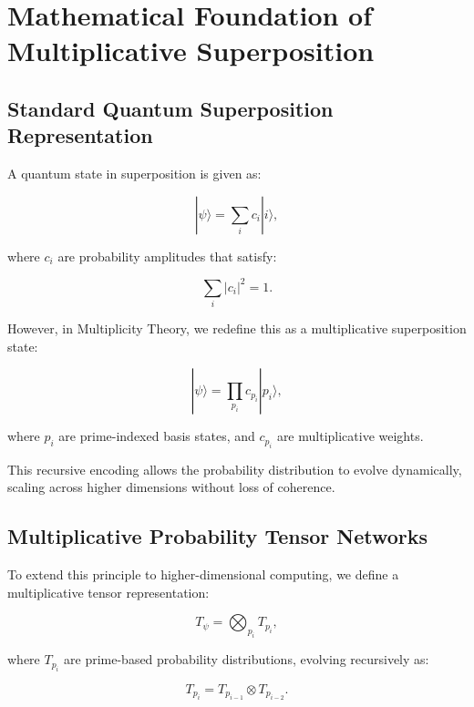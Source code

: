 \documentclass{article}
\theoremstyle{plain}
\begin{document}
\section{Mathematical Foundation of Multiplicative Superposition}

\subsection{Standard Quantum Superposition Representation}

A quantum state in superposition is given as:

\begin{equation}
|\psi\rangle = \sum_{i} c_i |i\rangle,
\end{equation}

where \( c_i \) are probability amplitudes that satisfy:

\begin{equation}
\sum_{i} |c_i|^2 = 1.
\end{equation}

However, in Multiplicity Theory, we redefine this as a multiplicative superposition state:

\begin{equation}
|\psi\rangle = \prod_{p_i} c_{p_i} |p_i\rangle,
\end{equation}

where \( p_i \) are prime-indexed basis states, and \( c_{p_i} \) are multiplicative weights.

This recursive encoding allows the probability distribution to evolve dynamically, scaling across higher dimensions without loss of coherence.

\subsection{Multiplicative Probability Tensor Networks}

To extend this principle to higher-dimensional computing, we define a multiplicative tensor representation:

\begin{equation}
T_{\psi} = \bigotimes_{p_i} T_{p_i},
\end{equation}

where \( T_{p_i} \) are prime-based probability distributions, evolving recursively as:

\begin{equation}
T_{p_i} = T_{p_{i-1}} \otimes T_{p_{i-2}}.
\end{equation}
\end{document}
